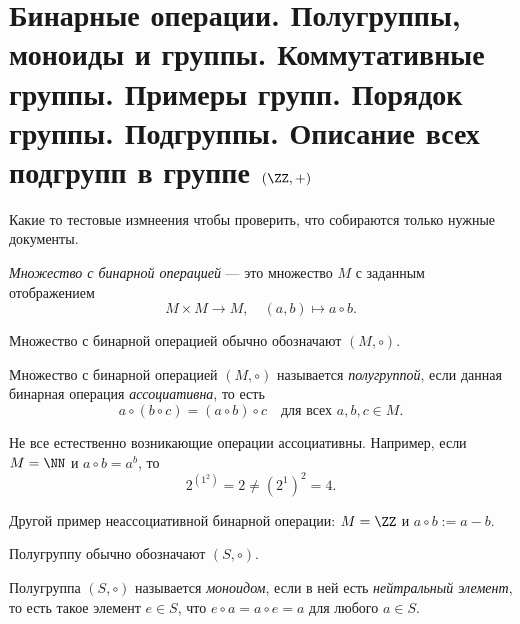 \section{Бинарные операции. Полугруппы, моноиды и группы. Коммутативные группы. Примеры групп. Порядок группы. Подгруппы. Описание всех подгрупп в группе $(\ZZ, +)$}

Какие то тестовые измнеения чтобы проверить, что собираются только нужные документы.


\begin{definition}
    \textit{Множество с бинарной операцией} --- это множество $M$ с заданным отображением
    \begin{equation*}
        M \times M \to M, \quad (a, b) \mapsto a \circ b
    .\end{equation*}

    Множество с бинарной операцией обычно обозначают $(M, \circ)$.
\end{definition}

\begin{definition}
    Множество с бинарной операцией $(M, \circ)$ называется \textit{полугруппой}, если данная бинарная операция \textit{ассоциативна}, то есть
    \begin{equation*}
        a \circ (b \circ c) = (a \circ b) \circ c \quad \text{для всех } a, b, c \in M
    .\end{equation*}
\end{definition}

Не все естественно возникающие операции ассоциативны. Например, если $M = \NN$ и $a \circ b = a ^{b}$, то
\begin{equation*}
    2^{(1^{2})} = 2 \neq (2^{1})^{2} = 4
.\end{equation*}

Другой пример неассоциативной бинарной операции: $M = \ZZ$ и $a \circ b := a - b$.

Полугруппу обычно обозначают $(S, \circ)$.

\begin{definition}
    Полугруппа $(S, \circ)$ называется \textit{моноидом}, если в ней есть \textit{нейтральный элемент}, то есть такое элемент $e \in S$, что $e \circ a = a \circ e = a$ для любого $a \in S$.
\end{definition}

\begin{comment}
    Если в полугруппе есть нейтральный элемент, то он один. В самом деле, $e_1 \circ e_2 = e_1 = e_2$.
\end{comment}

